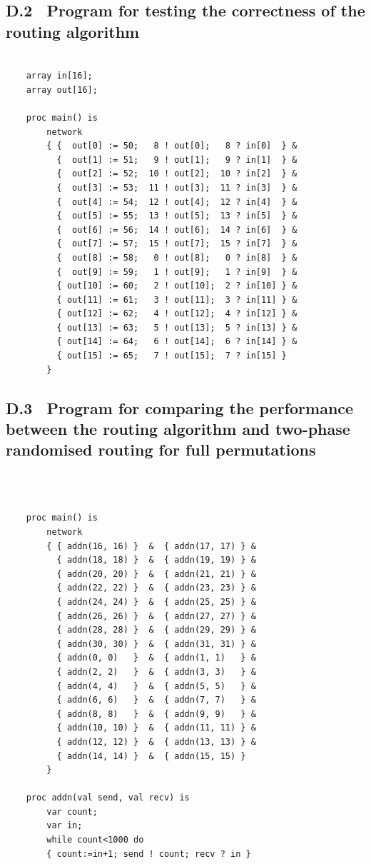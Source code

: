 \documentclass[a4paper, 12pt]{article}
\begin{document}
\subsection*{D.2 \ Program for testing the correctness of the routing algorithm}

\begin{lstlisting}

    array in[16];
    array out[16];

    proc main() is
        network
        { {  out[0] := 50;   8 ! out[0];   8 ? in[0]  } &
          {  out[1] := 51;   9 ! out[1];   9 ? in[1]  } &
          {  out[2] := 52;  10 ! out[2];  10 ? in[2]  } &
          {  out[3] := 53;  11 ! out[3];  11 ? in[3]  } &
          {  out[4] := 54;  12 ! out[4];  12 ? in[4]  } &
          {  out[5] := 55;  13 ! out[5];  13 ? in[5]  } &
          {  out[6] := 56;  14 ! out[6];  14 ? in[6]  } &
          {  out[7] := 57;  15 ! out[7];  15 ? in[7]  } &
          {  out[8] := 58;   0 ! out[8];   0 ? in[8]  } &
          {  out[9] := 59;   1 ! out[9];   1 ? in[9]  } &
          { out[10] := 60;   2 ! out[10];  2 ? in[10] } &
          { out[11] := 61;   3 ! out[11];  3 ? in[11] } &
          { out[12] := 62;   4 ! out[12];  4 ? in[12] } &
          { out[13] := 63;   5 ! out[13];  5 ? in[13] } &
          { out[14] := 64;   6 ! out[14];  6 ? in[14] } &
          { out[15] := 65;   7 ! out[15];  7 ? in[15] } 
        }

\end{lstlisting}

\newpage
\subsection*{D.3 \ Program for comparing the performance between the routing algorithm and two-phase randomised routing for full permutations}
\ 
\begin{lstlisting}

    proc main() is
        network
        { { addn(16, 16) }  &  { addn(17, 17) } &
          { addn(18, 18) }  &  { addn(19, 19) } &
          { addn(20, 20) }  &  { addn(21, 21) } &
          { addn(22, 22) }  &  { addn(23, 23) } &
          { addn(24, 24) }  &  { addn(25, 25) } &
          { addn(26, 26) }  &  { addn(27, 27) } &
          { addn(28, 28) }  &  { addn(29, 29) } &
          { addn(30, 30) }  &  { addn(31, 31) } &
          { addn(0, 0)   }  &  { addn(1, 1)   } &
          { addn(2, 2)   }  &  { addn(3, 3)   } &
          { addn(4, 4)   }  &  { addn(5, 5)   } &
          { addn(6, 6)   }  &  { addn(7, 7)   } &
          { addn(8, 8)   }  &  { addn(9, 9)   } &
          { addn(10, 10) }  &  { addn(11, 11) } &
          { addn(12, 12) }  &  { addn(13, 13) } &
          { addn(14, 14) }  &  { addn(15, 15) }
        }

    proc addn(val send, val recv) is 
        var count;
        var in;
        while count<1000 do
        { count:=in+1; send ! count; recv ? in }

\end{lstlisting}
\end{document}
